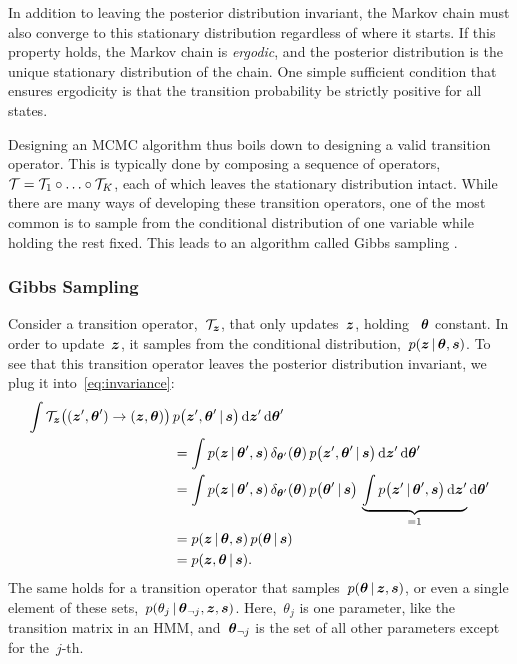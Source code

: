 In addition to leaving the posterior distribution invariant, the
Markov chain must also converge to this stationary distribution
regardless of where it starts. If this property holds, the Markov
chain is \emph{ergodic}, and the posterior distribution is the unique
stationary distribution of the chain. One simple sufficient condition
that ensures ergodicity is that the transition probability be strictly
positive for all states.

Designing an MCMC algorithm thus boils down to designing a valid
transition operator. This is typically done by composing a sequence of
operators,~${\mathcal{T} = \mathcal{T}_1 \circ \ldots \circ \mathcal{T}_K}$, each of which
leaves the stationary distribution intact. While there are many ways
of developing these transition operators, one of the most common 
is to sample from the conditional distribution of one variable 
while holding the rest fixed. This leads to an algorithm called 
Gibbs sampling \citep{geman1984stochastic}.

\subsubsection{Gibbs Sampling}
Consider a transition operator,~$\mathcal{T}_{\boldsymbol{z}}$, that only updates~$\boldsymbol{z}$,
holding ~$\boldsymbol{\theta}$ constant. In order to update~$\boldsymbol{z}$, it samples from
the conditional distribution,~$p(\boldsymbol{z} \,|\, \boldsymbol{\theta}, \boldsymbol{s})$. To see
that this transition operator leaves the posterior distribution
invariant, we plug it into~\eqref{eq:invariance}:
\begin{align*}
  \int \mathcal{T}_{\boldsymbol{z}} \big((\boldsymbol{z}', \boldsymbol{\theta}') \to (\boldsymbol{z}, \boldsymbol{\theta}) \big) \, 
    &p \big(\boldsymbol{z}', \boldsymbol{\theta}' \,|\, \boldsymbol{s} \big) \, 
    \mathrm{d}\boldsymbol{z}' \, \mathrm{d}\boldsymbol{\theta}' \\
  &= \int p(\boldsymbol{z} \,|\, \boldsymbol{\theta}', \boldsymbol{s}) \, \delta_{\boldsymbol{\theta}'}(\boldsymbol{\theta}) \,
    p \big(\boldsymbol{z}', \boldsymbol{\theta}' \,|\, \boldsymbol{s} \big) \, 
    \mathrm{d}\boldsymbol{z}' \, \mathrm{d}\boldsymbol{\theta}' \\
  &= 
  \int p(\boldsymbol{z} \,|\, \boldsymbol{\theta}', \boldsymbol{s}) \, \delta_{\boldsymbol{\theta}'}(\boldsymbol{\theta}) \,
    p \big(\boldsymbol{\theta}' \,|\, \boldsymbol{s} \big) \,
     \underbrace{\int
    p \big(\boldsymbol{z}' \,|\, \boldsymbol{\theta}', \boldsymbol{s} \big) \, 
    \mathrm{d}\boldsymbol{z}'}_{=1}  \mathrm{d}\boldsymbol{\theta}' \\
  &= p(\boldsymbol{z} \,|\, \boldsymbol{\theta}, \boldsymbol{s}) \, p(\boldsymbol{\theta} \,|\, \boldsymbol{s}) \\
  &= p(\boldsymbol{z}, \boldsymbol{\theta} \,|\, \boldsymbol{s}).
\end{align*}
The same holds for a transition operator that
samples~${p(\boldsymbol{\theta} \,|\, \boldsymbol{z}, \boldsymbol{s})}$, or even a single element of these
sets,~${p(\theta_j \,|\, \boldsymbol{\theta}_{\neg j}, \boldsymbol{z}, \boldsymbol{s})}$.
Here,~$\theta_j$ is one parameter, like the transition matrix in an
HMM, and~$\boldsymbol{\theta}_{\neg j}$ is the set of all other parameters except
for the~$j$-th.

